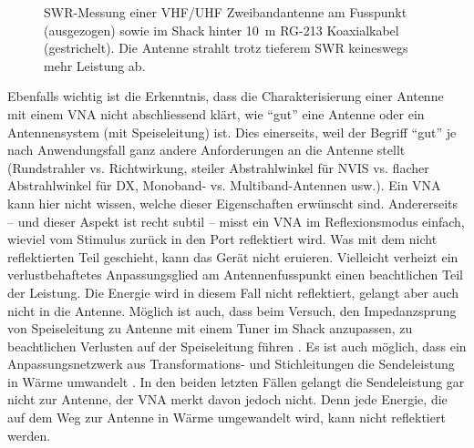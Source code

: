 \documentclass[twoside,a4paper,11pt,halfparskip,DIV=11,notitlepage]{scrartcl}
\begin{document}
\begin{figure}[H]
    \caption{SWR-Messung einer VHF/UHF Zweibandantenne am Fusspunkt (ausgezogen) sowie im Shack hinter 10~m
    RG-213 Koaxialkabel (gestrichelt). Die Antenne strahlt trotz tieferem SWR keineswegs mehr Leistung ab.}
    \label{fig:antenna_with_wo_feed}
\end{figure}

Ebenfalls wichtig ist die Erkenntnis, dass die Charakterisierung einer Antenne mit einem VNA
nicht abschliessend klärt, wie ``gut'' eine Antenne oder ein Antennensystem (mit Speiseleitung)
ist. Dies einerseits, weil der Begriff ``gut'' je nach Anwendungsfall ganz andere Anforderungen
an die Antenne stellt (Rundstrahler vs. Richtwirkung, steiler Abstrahlwinkel für NVIS vs.
flacher Abstrahlwinkel für DX, Monoband- vs. Multiband-Antennen usw.). Ein VNA
kann hier nicht wissen, welche dieser Eigenschaften erwünscht sind. Andererseits -- und dieser
Aspekt ist recht subtil -- misst ein VNA im Reflexionsmodus einfach, wieviel vom Stimulus
zurück in den Port reflektiert wird. Was mit dem nicht reflektierten Teil geschieht, kann
das Gerät nicht eruieren. Vielleicht verheizt ein verlustbehaftetes Anpassungsglied am
Antennenfusspunkt einen beachtlichen Teil der Leistung. Die Energie wird in diesem Fall nicht
reflektiert, gelangt aber auch nicht in die Antenne. Möglich ist auch, dass beim Versuch,
den Impedanzsprung von Speiseleitung zu Antenne mit einem Tuner im Shack anzupassen, zu
beachtlichen Verlusten auf der Speiseleitung führen \cite{walraven2006understanding}. Es ist
auch möglich, dass ein Anpassungsnetzwerk aus Transformations- und Stichleitungen die
Sendeleistung in Wärme umwandelt \cite{doberenz2019swrgut}. In den beiden letzten Fällen
gelangt die Sendeleistung gar nicht zur Antenne, der VNA merkt davon jedoch nicht. Denn
jede Energie, die auf dem Weg zur Antenne in Wärme umgewandelt wird, kann nicht reflektiert
werden.
\end{document}
